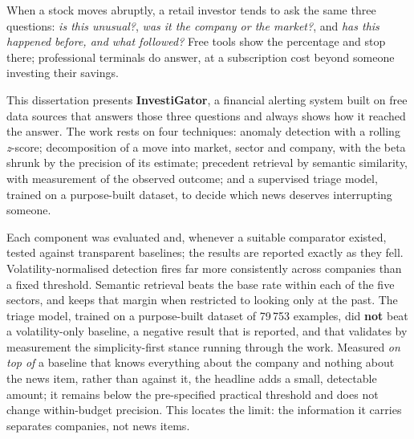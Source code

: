 \begin{abstract}
O sistema esteve em funcionamento contínuo durante a escrita desta dissertação, e as suas próprias decisões foram avaliadas uma segunda vez contra o que o mercado fez a seguir, sobre $825$ decisões já maturadas.

O sistema recusa, por desenho, prever preços: explica o que já aconteceu, com a evidência ao lado. A única excepção é declarada como tal e vai no fim de cada alerta: uma probabilidade de o mercado reagir de forma invulgar, \emph{em qualquer direção}, que é uma afirmação sobre a materialidade e nunca sobre o sentido do movimento.
\end{abstract}

\begin{abstractotherlanguage}
When a stock moves abruptly, a retail investor tends to ask the same three questions:
\emph{is this unusual?}, \emph{was it the company or the market?}, and \emph{has this happened
before, and what followed?} Free tools show the percentage and stop there; professional terminals do
answer, at a subscription cost beyond someone investing their savings.

This dissertation presents \textbf{InvestiGator}, a financial alerting system built on free data
sources that answers those three questions and always shows how it reached the answer. The work
rests on four techniques: anomaly detection with a rolling \emph{z}-score; decomposition of a move
into market, sector and company, with the beta shrunk by the precision of its estimate; precedent
retrieval by semantic similarity, with measurement of the observed outcome; and a supervised triage
model, trained on a purpose-built dataset, to decide which news deserves interrupting someone.

Each component was evaluated and, whenever a suitable comparator existed, tested against transparent
baselines; the results are reported exactly as they fell. Volatility-normalised detection fires far more consistently across companies than a fixed
threshold. Semantic retrieval beats the base rate within each of the five sectors, and keeps that margin
when restricted to looking only at the past. The triage model, trained on
a purpose-built dataset of 79\,753 examples, did \textbf{not} beat a volatility-only baseline, a negative result that is
reported, and that validates by measurement the simplicity-first stance running through the work. Measured \emph{on top of} a baseline that knows everything about the company and nothing about the news item, rather than against it, the headline adds a small, detectable amount; it remains below the pre-specified practical threshold and does not change within-budget precision. This locates the limit: the information it carries separates companies, not news items.


\end{abstractotherlanguage}
